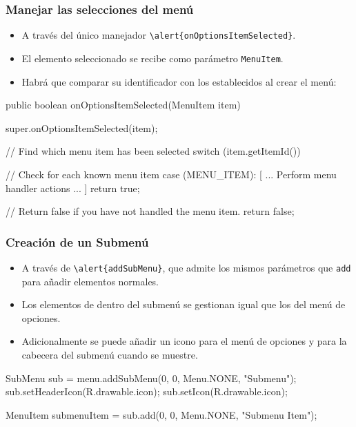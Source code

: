 \documentclass[hyperref={pdfpagelabels=true},ucs]{beamer}
\begin{document}
\begin{frame}[fragile]
\frametitle{Manejar las selecciones del menú}

\begin{itemize}
\item A través del único manejador \Verb|\alert{onOptionsItemSelected}|.
\item El elemento seleccionado se recibe como parámetro \verb|MenuItem|.
\item Habrá que comparar su identificador con los establecidos al
  crear el menú:
\end{itemize}

\begin{tiny}
\begin{block}{}
\begin{java}
public boolean onOptionsItemSelected(MenuItem item) {
  super.onOptionsItemSelected(item);

  // Find which menu item has been selected
  switch (item.getItemId()) {

    // Check for each known menu item
    case (MENU_ITEM):
      [ ... Perform menu handler actions ... ]
      return true;
  }

  // Return false if you have not handled the menu item.
  return false;
}

\end{java}
\end{block}
\end{tiny}

\end{frame}


\begin{frame}[fragile]
\frametitle{Creación de un Submenú}

\begin{itemize}
\item A través de \Verb|\alert{addSubMenu}|, que admite los mismos
  parámetros que \Verb|add| para añadir elementos normales.
\item Los elementos de dentro del submenú se gestionan igual que los
  del menú de opciones.
\item Adicionalmente se puede añadir un icono para el menú de opciones
  y para la cabecera del submenú cuando se muestre.
\end{itemize}

\begin{tiny}
\begin{block}{}
\begin{java}
  SubMenu sub = menu.addSubMenu(0, 0, Menu.NONE, "Submenu");
  sub.setHeaderIcon(R.drawable.icon);
  sub.setIcon(R.drawable.icon);

  MenuItem submenuItem = sub.add(0, 0, Menu.NONE, "Submenu Item");
\end{java}
\end{block}
\end{tiny}


\end{frame}
\end{document}
